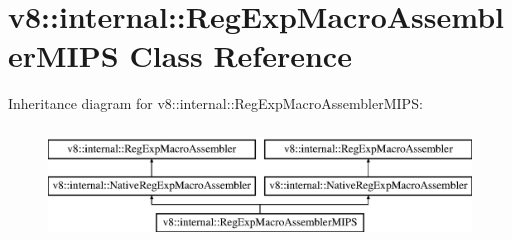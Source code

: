 \hypertarget{classv8_1_1internal_1_1_reg_exp_macro_assembler_m_i_p_s}{}\section{v8\+:\+:internal\+:\+:Reg\+Exp\+Macro\+Assembler\+M\+I\+PS Class Reference}
\label{classv8_1_1internal_1_1_reg_exp_macro_assembler_m_i_p_s}
Inheritance diagram for v8\+:\+:internal\+:\+:Reg\+Exp\+Macro\+Assembler\+M\+I\+PS\+:\begin{figure}[H]
\begin{center}
\leavevmode
\includegraphics[height=3.000000cm]{classv8_1_1internal_1_1_reg_exp_macro_assembler_m_i_p_s}
\end{center}
\end{figure}
